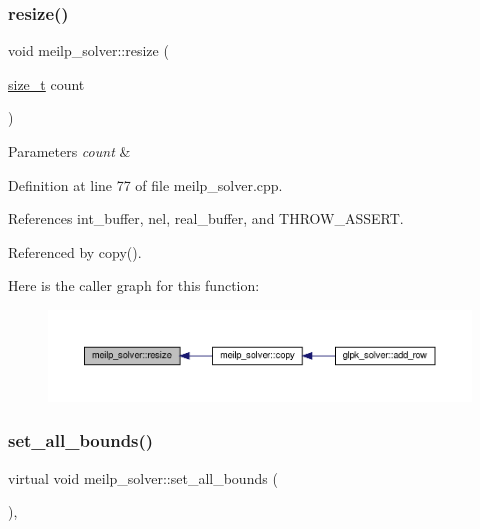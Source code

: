 \subsubsection{\texorpdfstring{resize()}{resize()}}
{\footnotesize\ttfamily void meilp\+\_\+solver\+::resize (\begin{DoxyParamCaption}\item[{\hyperlink{tutorial__fpt__2017_2intro_2sixth_2test_8c_a7c94ea6f8948649f8d181ae55911eeaf}{size\+\_\+t}}]{count }\end{DoxyParamCaption})\hspace{0.3cm}{\ttfamily [protected]}}


\begin{DoxyParams}{Parameters}
{\em count} & \\
\hline
\end{DoxyParams}


Definition at line 77 of file meilp\+\_\+solver.\+cpp.



References int\+\_\+buffer, nel, real\+\_\+buffer, and T\+H\+R\+O\+W\+\_\+\+A\+S\+S\+E\+RT.



Referenced by copy().

Here is the caller graph for this function\+:
\nopagebreak
\begin{figure}[H]
\begin{center}
\leavevmode
\includegraphics[width=350pt]{dc/d7f/classmeilp__solver_a4c58b5afa4d7061540b8cb93213b8154_icgraph}
\end{center}
\end{figure}
\mbox{\label{classmeilp__solver_abf7a38326551db34e423396517198895}} 
\subsubsection{\texorpdfstring{set\+\_\+all\+\_\+bounds()}{set\_all\_bounds()}}
{\footnotesize\ttfamily virtual void meilp\+\_\+solver\+::set\+\_\+all\+\_\+bounds (\begin{DoxyParamCaption}{ }\end{DoxyParamCaption})\hspace{0.3cm}{\ttfamily [protected]}, {}}



